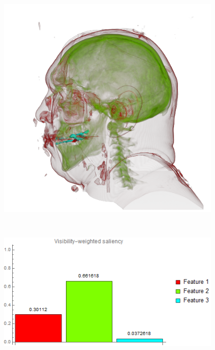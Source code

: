 \begin{figure}
	\centering
	\begin{minipage}{.24\textwidth}
		\includegraphics[width=1\linewidth]{images/vismale_week_green}
		\subcaption{}
	\end{minipage}~
	\begin{minipage}{.25\textwidth}
		\includegraphics[width=1\linewidth]{images/vismale_week_green_visibility_saliency_weighted_chart}
		\subcaption{}
	\end{minipage}~
	\begin{minipage}{.24\textwidth}

\end{minipage}
\end{figure}
